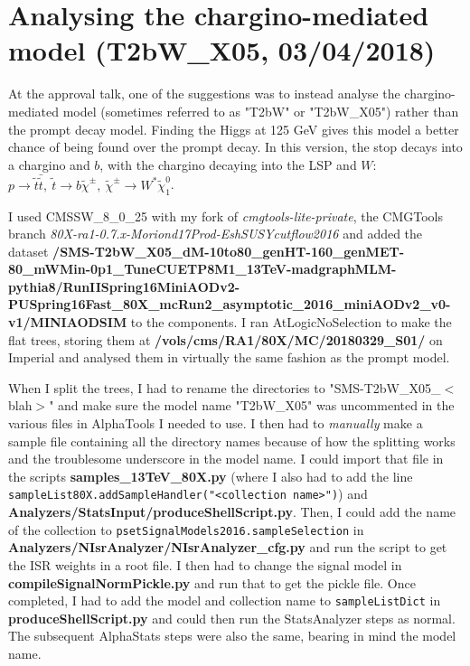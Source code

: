 \section{Analysing the chargino-mediated model (T2bW\_X05, 03/04/2018)}

At the approval talk, one of the suggestions was to instead analyse the chargino-mediated model (sometimes referred to as "T2bW" or "T2bW\_X05") rather than the prompt decay model. Finding the Higgs at 125 GeV gives this model a better chance of being found over the prompt decay. In this version, the stop decays into a chargino and $b$, with the chargino decaying into the LSP and $W$: $p \rightarrow \tilde{t} \bar{\tilde{t}}, \ \tilde{t} \rightarrow b\tilde{\chi}^{\pm}, \ \tilde{\chi}^{\pm} \rightarrow W^* \tilde{\chi}_1^0$.

I used CMSSW\_8\_0\_25 with my fork of \emph{cmgtools-lite-private}, the CMGTools branch \emph{80X-ra1-0.7.x-Moriond17Prod-EshSUSYcutflow2016} and added the dataset \textbf{/SMS-T2bW\_X05\_dM-10to80\_genHT-160\_genMET-80\_mWMin-0p1\_TuneCUETP8M1\_13TeV-madgraphMLM-pythia8/RunIISpring16MiniAODv2-PUSpring16Fast\_80X\_mcRun2\_asymptotic\_2016\_miniAODv2\_v0-v1/MINIAODSIM} to the components. I ran AtLogicNoSelection to make the flat trees, storing them at \textbf{/vols/cms/RA1/80X/MC/20180329\_S01/} on Imperial and analysed them in virtually the same fashion as the prompt model.

When I split the trees, I had to rename the directories to "SMS-T2bW\_X05\_$<$blah$>$" and make sure the model name "T2bW\_X05" was uncommented in the various files in AlphaTools I needed to use. I then had to \emph{manually} make a sample file containing all the directory names because of how the splitting works and the troublesome underscore in the model name. I could import that file in the scripts \textbf{samples\_13TeV\_80X.py} (where I also had to add the line \texttt{sampleList80X.addSampleHandler("<collection name>")}) and \textbf{Analyzers/StatsInput/produceShellScript.py}. Then, I could add the name of the collection to \texttt{psetSignalModels2016.sampleSelection} in \textbf{Analyzers/NIsrAnalyzer/NIsrAnalyzer\_cfg.py} and run the script to get the ISR weights in a root file. I then had to change the signal model in \textbf{compileSignalNormPickle.py} and run that to get the pickle file. Once completed, I had to add the model and collection name to \texttt{sampleListDict} in \textbf{produceShellScript.py} and could then run the StatsAnalyzer steps as normal. The subsequent AlphaStats steps were also the same, bearing in mind the model name.

